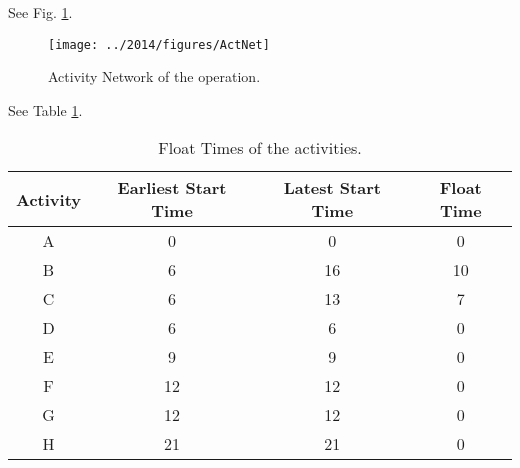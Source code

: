 %
%

\begin{subquestions}


\subquestion

\begin{subsubquestions}
	
\subsubquestion

See Fig. \ref{2014:q2:fig:ActNet}.

\begin{figure}
	\begin{center}
		\texttt{[image: ../2014/figures/ActNet]}
		\caption{\label{2014:q2:fig:ActNet} Activity Network of the operation.}
	\end{center}
\end{figure}


\subsubquestion

 See Table \ref{2014:tab:Act}. 
\begin{table}[ht]
	\centering
	\begin{tabular}{|c|c|c|c|}
		\hline
		Activity&Earliest Start Time&Latest Start Time&Float Time\\
		\hline
		A & 0 & 0 & 0 \\
		B & 6 & 16 & 10 \\
		C & 6 & 13 & 7 \\
		D & 6 & 6 & 0 \\
		E & 9 & 9 & 0 \\
		F & 12 & 12 & 0 \\
		G & 12 & 12 & 0 \\
		H & 21 & 21 & 0  \\
		\hline
		
	\end{tabular}
\caption{\label{2014:tab:Act} Float Times of the activities.}
\end{table}


\end{subsubquestions}
\end{subquestions}
